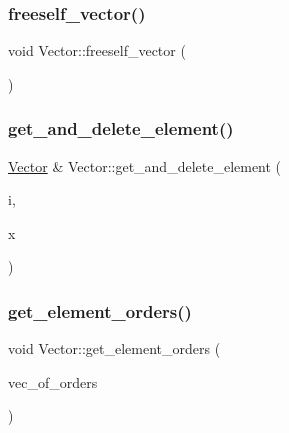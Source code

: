 \mbox{\label{class_vector_ad55c58937ca8fb342247a2c0fb572d20}} 
\subsubsection{\texorpdfstring{freeself\+\_\+vector()}{freeself\_vector()}}
{\footnotesize\ttfamily void Vector\+::freeself\+\_\+vector (\begin{DoxyParamCaption}{ }\end{DoxyParamCaption})}

\mbox{\label{class_vector_a075b82bb136a3fad137b9c8dfb1da4c9}} 
\subsubsection{\texorpdfstring{get\+\_\+and\+\_\+delete\+\_\+element()}{get\_and\_delete\_element()}}
{\footnotesize\ttfamily \mbox{\hyperlink{class_vector}{Vector}} \& Vector\+::get\+\_\+and\+\_\+delete\+\_\+element (\begin{DoxyParamCaption}\item[{\mbox{\hyperlink{galois_8h_a09fddde158a3a20bd2dcadb609de11dc}{I\+NT}}}]{i,  }\item[{\mbox{\hyperlink{classdiscreta__base}{discreta\+\_\+base}} \&}]{x }\end{DoxyParamCaption})}

\mbox{\label{class_vector_ac83f27123b1c43f3953b81de0392eae7}} 
\subsubsection{\texorpdfstring{get\+\_\+element\+\_\+orders()}{get\_element\_orders()}}
{\footnotesize\ttfamily void Vector\+::get\+\_\+element\+\_\+orders (\begin{DoxyParamCaption}\item[{\mbox{\hyperlink{class_vector}{Vector}} \&}]{vec\+\_\+of\+\_\+orders }\end{DoxyParamCaption})}


